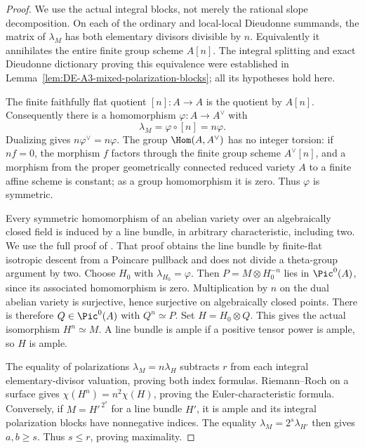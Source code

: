 \begin{proof}
We use the actual integral blocks, not merely the rational slope
decomposition.  On each of the ordinary and local-local Dieudonne
summands, the matrix of $\lambda_M$ has both elementary divisors
divisible by $n$.  Equivalently it annihilates the entire finite
group scheme $A[n]$.  The integral splitting and exact Dieudonne
dictionary proving this equivalence were established in
Lemma~\ref{lem:DE-A3-mixed-polarization-blocks}; all its hypotheses
hold here.

The finite faithfully flat quotient $[n]:A\to A$ is the quotient
by $A[n]$.  Consequently there is a homomorphism
$\varphi:A\to A^\vee$ with
\[
                   \lambda_M=\varphi\circ[n]=n\varphi.
\]
Dualizing gives $n\varphi^\vee=n\varphi$.
The group $\Hom(A,A^\vee)$ has no integer torsion: if $n f=0$,
the morphism $f$ factors through the finite group scheme
$A^\vee[n]$, and a morphism from the proper geometrically
connected reduced variety $A$ to a finite affine scheme is constant;
as a group homomorphism it is zero.  Thus $\varphi$ is symmetric.

Every symmetric homomorphism of an abelian variety over an
algebraically closed field is induced by a line bundle, in arbitrary
characteristic, including two.  We use the full proof of
\cite[Proposition~11.2 and Corollary~11.3, pp.~159--160]
{EdixhovenVanDerGeerMoonenAV}.  That proof obtains the line bundle
by finite-flat isotropic descent from a Poincare pullback and does
not divide a theta-group argument by two.
Choose $H_0$ with $\lambda_{H_0}=\varphi$.
Then $P=M\otimes H_0^{-n}$ lies in $\Pic^0(A)$, since its associated
homomorphism is zero.  Multiplication by $n$ on the dual abelian
variety is surjective, hence surjective on algebraically closed
points.  There is therefore $Q\in\Pic^0(A)$ with $Q^n\simeq P$.
Set $H=H_0\otimes Q$.  This gives the actual isomorphism
$H^n\simeq M$.  A line bundle is ample if a positive tensor power
is ample, so $H$ is ample.

The equality of polarizations $\lambda_M=n\lambda_H$ subtracts
$r$ from each integral elementary-divisor valuation, proving both
index formulas.  Riemann--Roch on a surface gives
$\chi(H^n)=n^2\chi(H)$, proving the Euler-characteristic formula.
Conversely, if $M=H'^{\,2^s}$ for a line bundle $H'$, it is ample
and its integral polarization blocks have nonnegative indices.
The equality $\lambda_M=2^s\lambda_{H'}$ then gives $a,b\ge s$.
Thus $s\le r$, proving maximality.
\end{proof}

